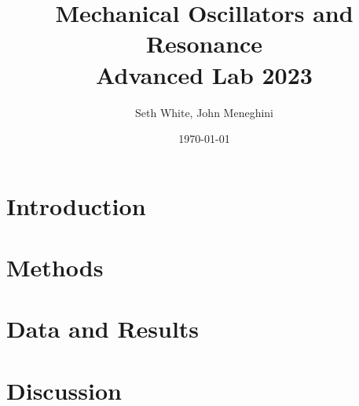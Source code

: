 \documentclass[12pt, letterpaper]{article}
\title{Mechanical Oscillators and Resonance \\
    \large Advanced Lab 2023}
\author{Seth White, John Meneghini}
\date{\today}
\begin{document}
    \maketitle

    \begin{abstract}
        
    \end{abstract}
\newpage

    \section*{Introduction}
    




    \section*{Methods}
    

	\newpage
    \section*{Data and Results}
    

	\newpage
    \section*{Discussion}
    

    \newpage
    
\end{document}
